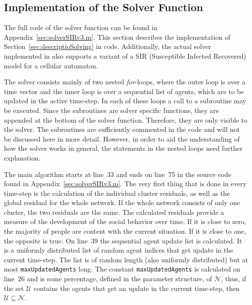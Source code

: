 
\subsection{Implementation of the Solver Function}
\label{sec:implementSolver}

The full code of the solver function can be found in
Appendix~\ref{sec:solverSIRv3.m}.  This section describes the implementation of
Section~\ref{sec:descriptioSolving} in \matlab code.  Additionally, the actual
solver implemented in \matlab also supports a variant of a SIR (Susceptible
Infected Recovered) model for a cellular automaton.

The solver consists mainly of two nested \textsl{for}-loops, where the outer
loop is over a time vector and the inner loop is over a sequential list of
agents, which are to be updated in the active time-step.  In each of these
loops a call to a subroutine may be executed.  Since the subroutines are solver
specific functions, they are appended at the bottom of the solver function.
Therefore, they are only visible to the solver.  The subroutines are
sufficiently commented in the code and will not be discussed here in more
detail.  However, in order to aid the understanding of how the solver works in
general, the statements in the nested loops need further explanation.

The main algorithm starts at line~33 and ends on line~75 in the source code
found in Appendix~\ref{sec:solverSIRv3.m}.  The very first thing that is done
in every time-step is the calculation of the individual cluster residuals, as
well as the global residual for the whole network.  If the whole network
consists of only one cluster, the two residuals are the same.  The calculated
residuals provide a measure of the development of the social behavior over
time.  If it is close to zero, the majority of people are content with the
current situation.  If it is close to one, the opposite is true.  On line~39
the sequential agent update list is calculated.  It is a uniformly distributed
list of random agent indices that get update in the current time-step.  The
list is of random length (also uniformly distributed) but at most
\texttt{maxUpdatedAgents} long.  The constant \texttt{maxUpdatedAgents} is
calculated on line~26 and is some percentage, defined in the parameter
structure, of $\mathcal{N}$, thus, if the set $\mathcal{U}$ contains the agents
that get an update in the current time-step, then
$\mathcal{U}\subseteq\mathcal{N}$.

